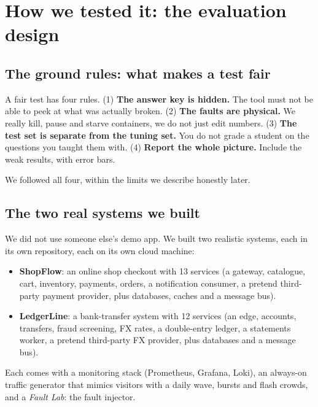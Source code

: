 \chapter{How we tested it: the evaluation design}
\label{ch:eval}

\section{The ground rules: what makes a test fair}
\begin{simplebox}
A fair test has four rules. (1) \textbf{The answer key is hidden.} The tool must not be able to peek at what was actually broken. (2) \textbf{The faults are physical.} We really kill, pause and starve containers, we do not just edit numbers. (3) \textbf{The test set is separate from the tuning set.} You do not grade a student on the questions you taught them with. (4) \textbf{Report the whole picture.} Include the weak results, with error bars.

We followed all four, within the limits we describe honestly later.
\end{simplebox}

\section{The two real systems we built}
\begin{simplebox}
We did not use someone else's demo app. We built two realistic systems, each in its own repository, each on its own cloud machine:

\begin{itemize}
\item \textbf{ShopFlow}: an online shop checkout with 13 services (a gateway, catalogue, cart, inventory, payments, orders, a notification consumer, a pretend third-party payment provider, plus databases, caches and a message bus).
\item \textbf{LedgerLine}: a bank-transfer system with 12 services (an edge, accounts, transfers, fraud screening, FX rates, a double-entry ledger, a statements worker, a pretend third-party FX provider, plus databases and a message bus).
\end{itemize}

Each comes with a monitoring stack (Prometheus, Grafana, Loki), an always-on traffic generator that mimics visitors with a daily wave, bursts and flash crowds, and a \emph{Fault Lab}: the fault injector.
\end{simplebox}

